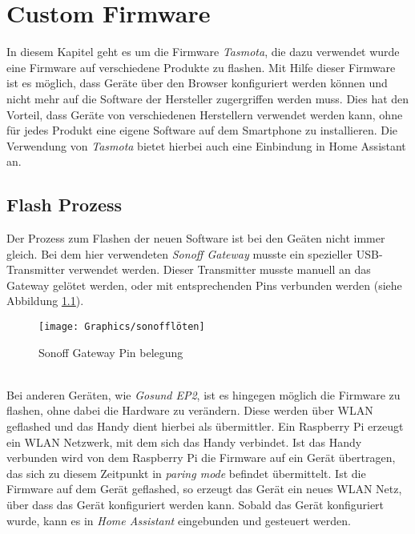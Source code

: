 \chapter{Custom Firmware}
In diesem Kapitel geht es um die Firmware \textit{Tasmota}, die dazu verwendet wurde eine Firmware auf verschiedene Produkte zu flashen. Mit Hilfe dieser Firmware ist es möglich, dass Geräte über den Browser konfiguriert werden können und nicht mehr auf die Software der Hersteller zugergriffen werden muss. Dies hat den Vorteil, dass Geräte von verschiedenen Herstellern verwendet werden kann, ohne für jedes Produkt eine eigene Software auf dem Smartphone zu installieren.
Die Verwendung von \textit{Tasmota} bietet hierbei auch eine Einbindung in Home Assistant an.

\section{Flash Prozess}
Der Prozess zum Flashen der neuen Software ist bei den Geäten nicht immer gleich. Bei dem hier verwendeten \textit{Sonoff Gateway} musste ein spezieller USB-Transmitter verwendet werden.
Dieser Transmitter musste manuell an das Gateway gelötet werden, oder mit entsprechenden Pins verbunden werden (siehe Abbildung \ref{fig:sonoffpin}).
\begin{figure}[bth] 
    \centering
    \texttt{[image: Graphics/sonofflöten]}
    \caption{Sonoff Gateway Pin belegung}
    \label{fig:sonoffpin}
\end{figure}
\\
Bei anderen Geräten, wie \textit{Gosund EP2}, ist es hingegen möglich die Firmware zu flashen, ohne dabei die Hardware zu verändern. 
Diese werden über WLAN geflashed und das Handy dient hierbei als übermittler. Ein Raspberry Pi erzeugt ein WLAN Netzwerk, mit dem sich das Handy verbindet. Ist das Handy verbunden wird von dem Raspberry Pi die Firmware auf ein Gerät übertragen, das sich zu diesem Zeitpunkt in \textit{paring mode} befindet übermittelt.
Ist die Firmware auf dem Gerät geflashed, so erzeugt das Gerät ein neues WLAN Netz, über dass das Gerät konfiguriert werden kann.
Sobald das Gerät konfiguriert wurde, kann es in \textit{Home Assistant} eingebunden und gesteuert werden. 